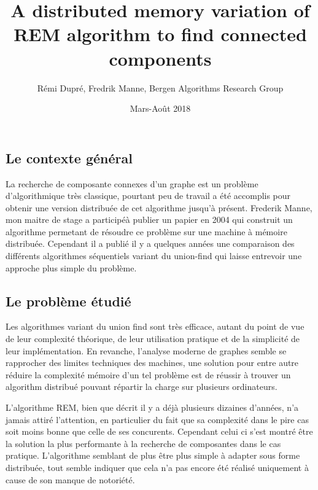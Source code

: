 \documentclass{article}
\newenvironment{point}[1]%
{\subsection*{#1}}%
{}
\begin{document}
\title{A distributed memory variation of REM algorithm to find connected components}

\author{Rémi Dupré, Fredrik Manne, Bergen Algorithms Research Group}

\date{Mars-Août 2018}

\maketitle

\pagestyle{empty} %
\thispagestyle{empty}


\begin{point}{Le contexte général}

  La recherche de composante connexes d'un graphe est un problème d'algorithmique très classique, pourtant peu de travail a été accomplis pour obtenir une version distribuée de cet algorithme jusqu'à présent.
  Frederik Manne, mon maitre de stage a participéà publier un papier en 2004 qui construit un algorithme permetant de résoudre ce problème sur une machine à mémoire distribuée.
  Cependant il a publié il y a quelques années une comparaison des différents algorithmes séquentiels variant du union-find qui laisse entrevoir une approche plus simple du problème.

\end{point}

\begin{point}{Le problème étudié}

  Les algorithmes variant du union find sont très efficace, autant du point de vue de leur complexité théorique, de leur utilisation pratique et de la simplicité de leur implémentation.
  En revanche, l'analyse moderne de graphes semble se rapprocher des limites techniques des machines, une solution pour entre autre réduire la complexité mémoire d'un tel problème est de réussir à trouver un algorithm distribué pouvant répartir la charge sur plusieurs ordinateurs.

  L'algorithme REM, bien que décrit il y a déjà plusieurs dizaines d'années, n'a jamais attiré l'attention, en particulier du fait que sa complexité dans le pire cas soit moins bonne que celle de ses concurents.
  Cependant celui ci s'est montré être la solution la plus performante à la recherche de composantes dans le cas pratique.
  L'algorithme semblant de plus être plus simple à adapter sous forme distribuée, tout semble indiquer que cela n'a pas encore été réalisé uniquement à cause de son manque de notoriété.

\end{point}
\end{document}
